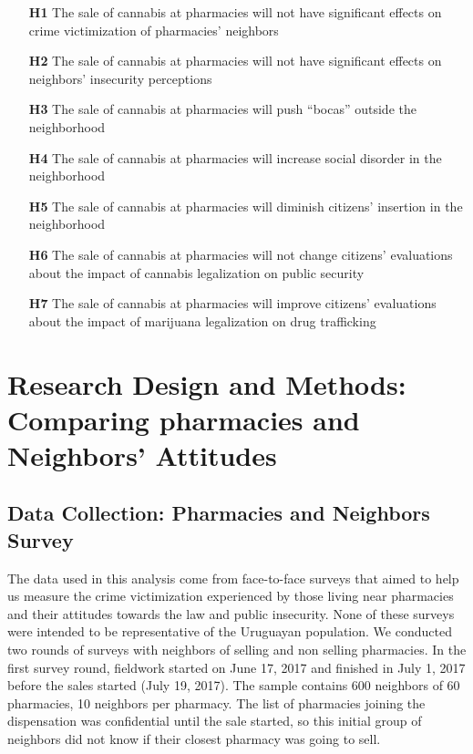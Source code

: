 \documentclass[11pt]{article}
\begin{document}
\begin{itemize}
\item [\textbf{H1}] The sale of cannabis at pharmacies will not have significant effects on crime victimization of pharmacies' neighbors

\item [\textbf{H2}] The sale of cannabis at pharmacies will not have significant effects on neighbors' insecurity perceptions

\item [\textbf{H3}] The sale of cannabis at pharmacies will push ``bocas'' outside the neighborhood

\item [\textbf{H4}] The sale of cannabis at pharmacies will increase social disorder in the neighborhood

\item [\textbf{H5}] The sale of cannabis at pharmacies will diminish citizens' insertion in the neighborhood

\item [\textbf{H6}] The sale of cannabis at pharmacies will not change citizens' evaluations about the impact of cannabis legalization on public security

\item [\textbf{H7}] The sale of cannabis at pharmacies will improve citizens' evaluations about the impact of marijuana legalization on drug trafficking

\end{itemize}

\section{Research Design and Methods: Comparing pharmacies and Neighbors' Attitudes}
\subsection{Data Collection: Pharmacies and Neighbors Survey}
The data used in this analysis come from face-to-face surveys that aimed to help us measure the crime victimization experienced by those living near pharmacies and their attitudes towards the law and public insecurity. None of these surveys were intended to be representative of the Uruguayan population. We conducted two rounds of surveys with neighbors of selling and non selling pharmacies. In the first survey round, fieldwork started on June 17, 2017 and finished in July 1, 2017 before the sales started (July 19, 2017). The sample contains 600 neighbors of 60 pharmacies, 10 neighbors per pharmacy. The list of pharmacies joining the dispensation was confidential until the sale started, so this initial group of neighbors did not know if their closest pharmacy was going to sell.
\end{document}

